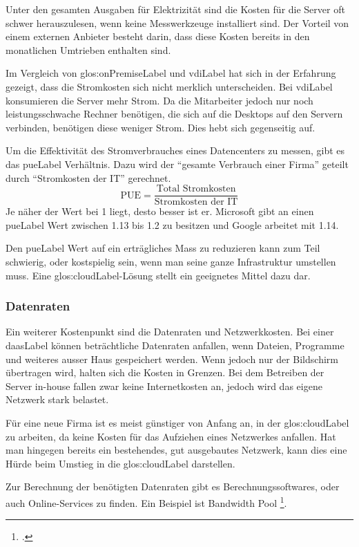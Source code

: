 Unter den gesamten Ausgaben für Elektrizität sind die Kosten für die Server oft schwer herauszulesen, wenn keine Messwerkzeuge installiert sind. Der Vorteil von einem externen Anbieter besteht darin, dass diese Kosten bereits in den monatlichen Umtrieben enthalten sind.

Im Vergleich von \gls{glos:onPremiseLabel} und \Gls{vdiLabel} hat sich in der Erfahrung gezeigt, dass die Stromkosten sich nicht merklich unterscheiden. Bei \Gls{vdiLabel} konsumieren die Server mehr Strom. Da die Mitarbeiter jedoch nur noch leistungsschwache Rechner benötigen, die sich auf die Desktops auf den Servern verbinden, benötigen diese weniger Strom. Dies hebt sich gegenseitig auf.

Um die Effektivität des Stromverbrauches eines Datencenters zu messen, gibt es das \Gls{pueLabel} Verhältnis. Dazu wird der "`gesamte Verbrauch einer Firma"' geteilt durch "`Stromkosten der IT"' gerechnet.
\[\text{PUE} = \frac{\text{Total Stromkosten}}{\text{Stromkosten der IT}}\]
Je näher der Wert bei 1 liegt, desto besser ist er. Microsoft gibt an einen \Gls{pueLabel} Wert zwischen 1.13 bis 1.2 zu besitzen und Google arbeitet mit 1.14.

Den \Gls{pueLabel} Wert auf ein erträgliches Mass zu reduzieren kann zum Teil schwierig, oder kostspielig sein, wenn man seine ganze Infrastruktur umstellen muss. Eine \Gls{glos:cloudLabel}-Lösung stellt ein geeignetes Mittel dazu dar.

\subsubsection{Datenraten}
Ein weiterer Kostenpunkt sind die Datenraten und Netzwerkkosten. Bei einer \Gls{daasLabel} können beträchtliche Datenraten anfallen, wenn Dateien, Programme und weiteres ausser Haus gespeichert werden. Wenn jedoch nur der Bildschirm übertragen wird, halten sich die Kosten in Grenzen. Bei dem Betreiben der Server in-house fallen zwar keine Internetkosten an, jedoch wird das eigene Netzwerk stark belastet.

Für eine neue Firma ist es meist günstiger von Anfang an, in der \Gls{glos:cloudLabel} zu arbeiten, da keine Kosten für das Aufziehen eines Netzwerkes anfallen.
Hat man hingegen bereits ein bestehendes, gut ausgebautes Netzwerk, kann dies eine Hürde beim Umstieg in die \Gls{glos:cloudLabel} darstellen.

Zur Berechnung der benötigten Datenraten gibt es Berechnungssoftwares, oder auch Online-Services zu finden. Ein Beispiel ist Bandwidth Pool \footcite{What_is_Bandwidth_Pool_Bandwidth_Pool}.

